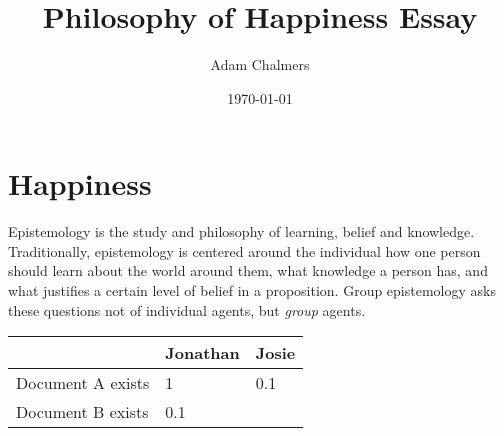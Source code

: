 \documentclass{article}
\title{Philosophy of Happiness Essay}
\author{Adam Chalmers}
\date{\today}
\begin{document}
\frenchspacing
\onehalfspacing
\maketitle


\section{Happiness}

Epistemology is the study and philosophy of learning, belief and knowledge. Traditionally, epistemology is centered around the individual \textemdash{} how one person should learn about the world around them, what knowledge a person has, and what justifies a certain level of belief in a proposition. Group epistemology asks these questions not of individual agents, but \textit{group} agents. 

\begin{center}
\begin{tabular}{ | l | l | l |}
  \hline
    & Jonathan & Josie \\ \hline
  Document A exists & 1 & 0.1 \\ \hline
  Document B exists & 0.1  & \citet{haybron2008pursuit} \\ \hline
\end{tabular}
\end{center}
\noindent




\end{document}
